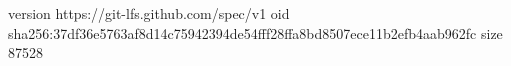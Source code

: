 version https://git-lfs.github.com/spec/v1
oid sha256:37df36e5763af8d14c75942394de54fff28ffa8bd8507ece11b2efb4aab962fc
size 87528
